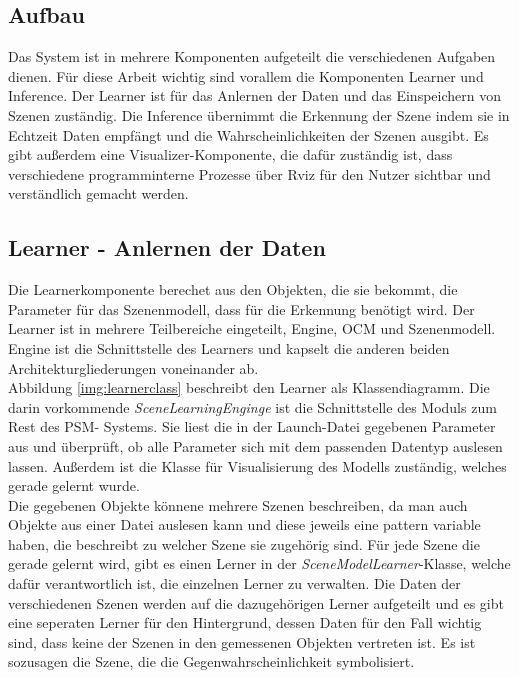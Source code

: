 \subsection{Aufbau}
Das System ist in mehrere Komponenten aufgeteilt die verschiedenen Aufgaben dienen. Für diese Arbeit wichtig sind vorallem die Komponenten Learner und Inference. Der Learner ist für das Anlernen der Daten und das Einspeichern von Szenen zuständig. Die Inference übernimmt die Erkennung der Szene indem sie in Echtzeit Daten empfängt und die Wahrscheinlichkeiten der Szenen ausgibt. Es gibt außerdem eine Visualizer-Komponente, die dafür zuständig ist, dass verschiedene programminterne Prozesse über Rviz für den Nutzer sichtbar und verständlich gemacht werden.\cite{sibo96}
\subsection{Learner - Anlernen der Daten}
Die Learnerkomponente berechet aus den Objekten, die sie bekommt, die Parameter für das Szenenmodell, dass für die Erkennung benötigt wird. Der Learner ist in mehrere Teilbereiche eingeteilt, Engine, OCM und Szenenmodell. Engine ist die Schnittstelle des Learners und kapselt die anderen beiden Architekturgliederungen voneinander ab.\smallskip\\
Abbildung \ref{img:learnerclass} beschreibt den Learner als Klassendiagramm. Die darin vorkommende \textit{SceneLearningEnginge} ist die Schnittstelle des Moduls zum Rest des PSM- Systems. Sie liest die in der Launch-Datei gegebenen Parameter aus und überprüft, ob alle Parameter sich mit dem passenden Datentyp auslesen lassen. Außerdem ist die Klasse für Visualisierung des Modells zuständig, welches gerade gelernt wurde. \smallskip\\
Die gegebenen Objekte könnene mehrere Szenen beschreiben, da man auch Objekte aus einer Datei auslesen kann und diese jeweils eine pattern variable haben, die beschreibt zu welcher Szene sie zugehörig sind. Für jede Szene die gerade gelernt wird, gibt es einen Lerner in der \textit{SceneModelLearner}-Klasse, welche dafür verantwortlich ist, die einzelnen Lerner zu verwalten. Die Daten der verschiedenen Szenen werden auf die dazugehörigen Lerner aufgeteilt und es gibt eine seperaten Lerner für den Hintergrund, dessen Daten für den Fall wichtig sind, dass keine der Szenen in den gemessenen Objekten vertreten ist. Es ist sozusagen die Szene, die die Gegenwahrscheinlichkeit symbolisiert.\smallskip\\
